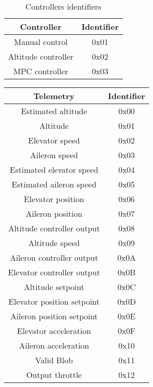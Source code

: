 \begin{table}[h]
\begin{center}
 \begin{tabular}{c c} 
\toprule
\rowcolor[HTML]{FFFC9E} 
 \textbf{Controller} & \textbf{Identifier}
\\ \midrule
 Manual control &0x01 \\  [1ex]
  Altitude controller  &0x02 \\  [1ex]
  MPC controller &0x03 \\  [1ex]
 \bottomrule
\end{tabular}
\end{center}
\caption{Controllers identifiers}
\label{tab:controllerIdentifiers}
\end{table}


\begin{table}[h]
\begin{center}
 \begin{tabular}{c c} 
\toprule
\rowcolor[HTML]{FFFC9E} 
 \textbf{Telemetry} & \textbf{Identifier}
\\ \midrule
 Estimated altitude &  0x00\\  [0.5ex] 
 Altitude & 0x01\\ [0.5ex] 
 Elevator speed & 0x02\\ [0.5ex] 
 Aileron speed & 0x03 \\  [0.5ex]  
 Estimated elevator speed & 0x04 \\ [0.5ex]  
 Estimated aileron speed & 0x05 \\  [0.5ex] 
 Elevator position & 0x06 \\  [0.5ex]  
 Aileron position & 0x07 \\  [0.5ex] 
 Altitude controller output & 0x08 \\  [0.5ex] 
 Altitude speed & 0x09  \\ [0.5ex] 
 Aileron controller output & 0x0A\\ [0.5ex]  
 Elevator controller output & 0x0B \\ [0.5ex]  
 Altitude setpoint & 0x0C \\  [0.5ex] 
 Elevator position setpoint & 0x0D \\  [0.5ex]  
 Aileron position setpoint & 0x0E\\ [0.5ex] 
 Elevator acceleration & 0x0F \\ [0.5ex] 
 Aileron acceleration & 0x10\\  [0.5ex] 
 Valid Blob & 0x11\\  [0.5ex] 
 Output throttle & 0x12\\  [0.5ex]  

\end{tabular}
\end{center}
\end{table}

